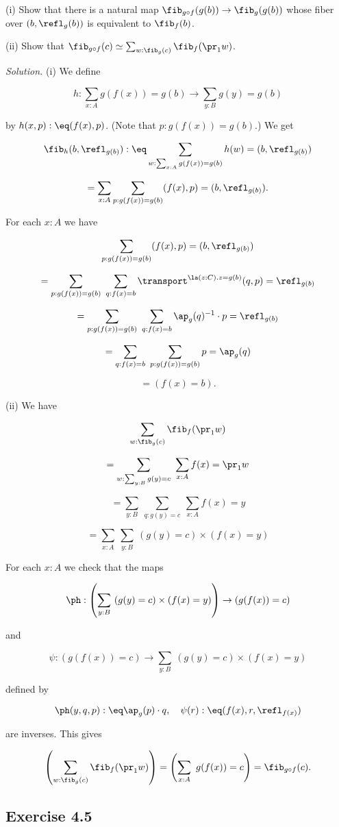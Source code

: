 \documentclass[12pt]{article}
\begin{document}
\nn(i) Show that there is a natural map $\fib_{g\circ f}(g(b))\to\fib_g(g(b))$ whose fiber over $(b, \refl_g(b) )$ is equivalent to $\fib_f(b)$.

\nn(ii) Show that $\fib_{g\circ f}(c)\simeq\sum_{w:\fib_g(c)}\fib_f(\pr_1w)$.

\nn\emph{Solution.} (i) We define 

$$h:\sum_{x:A}g(f(x))=g(b)\to\sum_{y:B}g(y)=g(b)$$ 

\nn by $h(x,p):\eq(f(x),p)$. (Note that $p:g(f(x))=g(b)$.) We get 

$$\fib_h(b,\refl_{g(b)}):\eq\sum_{w:\sum_{x:A}g(f(x))=g(b)}h(w)=(b,\refl_{g(b)})$$ 

$$=\sum_{x:A}\sum_{p:g(f(x))=g(b)}(f(x),p)=(b,\refl_{g(b)}).$$ 

\nn For each $x:A$ we have

$$\sum_{p:g(f(x))=g(b)}(f(x),p)=(b,\refl_{g(b)})$$ 

$$=\sum_{p:g(f(x))=g(b)}\ \sum_{q:f(x)=b}\transport^{\la(z:C).z=g(b)}(q,p)=\refl_{g(b)}$$ 

$$=\sum_{p:g(f(x))=g(b)}\ \sum_{q:f(x)=b}\ap_g(q)^{-1}\cdot p=\refl_{g(b)}$$ 

$$=\sum_{q:f(x)=b}\ \sum_{p:g(f(x))=g(b)}p=\ap_g(q)$$ 

$$=(f(x)=b).$$ 

\nn(ii) We have 

$$\sum_{w:\fib_g(c)}\fib_f(\pr_1w)$$ 

$$=\sum_{w:\sum_{y:B}g(y)=c}\ \sum_{x:A}f(x)=\pr_1w$$ 

$$=\sum_{y:B}\ \sum_{q:g(y)=c}\ \sum_{x:A}f(x)=y$$ 

$$=\sum_{x:A}\ \sum_{y:B}\ (g(y)=c)\times(f(x)=y)$$ 

\nn For each $x:A$ we check that the maps 

$$\ph:\left(\sum_{y:B}\ (g(y)=c)\times(f(x)=y)\right)\to(g(f(x))=c)$$ 

\nn and 

$$\psi:(g(f(x))=c)\to\sum_{y:B}\ (g(y)=c)\times(f(x)=y)$$ 

\nn defined by 

$$\ph(y,q,p):\eq\ap_g(p)\cdot q,\quad\psi(r):\eq(f(x),r,\refl_{f(x)})$$ 

\nn are inverses. This gives 

$$\left(\sum_{w:\fib_g(c)}\fib_f(\pr_1w)\right)=\left(\sum_{x:A}\ g(f(x))=c\right)=\fib_{g\circ f}(c).$$


\subsection{Exercise 4.5}\label{45}
\end{document}
